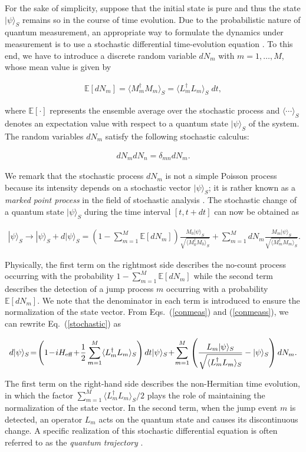 \documentclass{tADP2e}
\theoremstyle{plain}
\newcommand{\eqn}[1]{
\begin{eqnarray}
	#1
\end{eqnarray}
}
\theoremstyle{plain}
\theoremstyle{definition}
\begin{document}
For the sake of simplicity, suppose that the initial state is pure and thus the state $|\psi\rangle_{S}$ remains so in the course of time evolution. 
Due to the probabilistic nature of quantum measurement, an appropriate way to formulate the dynamics under measurement is to use a stochastic differential time-evolution equation \cite{GAP14}. To this end, we have to introduce a discrete random variable $dN_{m}$ with $m=1,\ldots,M$, whose  mean value is given by
\eqn{
{\mathbb{E}}[dN_{m}]=\langle {M}_{m}^{\dagger} {M}_{m}\rangle_{S}=\langle {L}_{m}^{\dagger} {L}_{m}\rangle_{S}\;dt,
}
where ${\mathbb{E}}[\cdot]$ represents the ensemble average over the stochastic process and $\langle\cdots\rangle_{S}$ denotes an expectation value with respect to a quantum state $|\psi\rangle_{S}$ of the system. 
The random variables $dN_m$ satisfy the following stochastic calculus:
\eqn{\label{stN}
dN_{m}dN_{n}=\delta_{mn}dN_{m}.
}
We remark that the stochastic process $dN_{m}$ is not a simple Poisson process because its intensity depends on a stochastic vector $|\psi\rangle_{S}$; 
it is rather known as a {\it marked point process} in the field of  stochastic analysis \cite{BA12}.
The stochastic change of a quantum state $|\psi\rangle_S$ during the time interval $[t,t+dt]$ can now be obtained as
\eqn{\label{stochastic}
|\psi\rangle_{S}\to|\psi\rangle_{S}+d|\psi\rangle_{S}\!=\!\!\left(1\!-\!\sum_{m=1}^{M}{\mathbb{E}}[dN_{m}]\right)\!\frac{ {M}_{0}|\psi\rangle_{S}}{\sqrt{\langle {M}_{0}^{\dagger} {M}_{0}\rangle_{S}}}\!+\!\sum_{m=1}^{M}\!dN_{m}\frac{ {M}_{m}|\psi\rangle_{S}}{\sqrt{\langle {M}_{m}^{\dagger} {M}_{m}\rangle_{S}}}.
}
Physically, the first term on the rightmost side describes the no-count process occurring with the probability $1-\sum_{m=1}^{M}{\mathbb{E}}[dN_{m}]$ while the second term describes the detection of a jump process $m$ occurring with a probability ${\mathbb{E}}[dN_{m}]$. We note that the denominator in each term is introduced to ensure the normalization of the state vector. 
From Eqs.~(\ref{conmeas}) and (\ref{conmeass}), we can rewrite Eq.~(\ref{stochastic}) as
\eqn{\label{conmeas2}
d|\psi\rangle_{S}\!=\!\left(1\!-\!i {H}_{{\rm eff}}\!+\!\frac{1}{2}\sum_{m=1}^{M}\langle {L}_{m}^{\dagger} {L}_{m}\rangle_{S}\right)dt|\psi\rangle_{S}\!+\!\sum_{m=1}^{M}\left(\frac{ {L}_{m}|\psi\rangle_{S}}{\sqrt{\langle {L}_{m}^{\dagger} {L}_{m}\rangle_{S}}}-|\psi\rangle_{S}\right)dN_{m}.
}
The first term on the right-hand side describes the non-Hermitian time evolution, in which the factor $\sum_{m=1}^M\langle {L}_{m}^{\dagger} {L}_{m}\rangle_{S}/2$ plays the role of maintaining the normalization of the state vector. In the second term, when the  jump event $m$ is detected, an operator $ {L}_{m}$ acts on the quantum state and causes its discontinuous change. A specific realization of this stochastic differential equation is often referred to as the {\it quantum trajectory} \cite{HC93}. 
\end{document}
